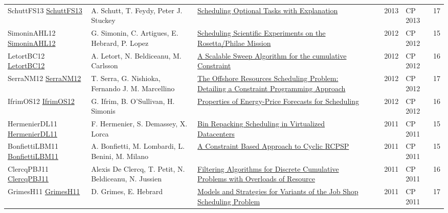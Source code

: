 {\begin{longtable}{p{3cm}p{6cm}p{7cm}rrrp{3cm}r}
SchuttFS13 \href{https://doi.org/10.1007/978-3-642-40627-0\_47}{SchuttFS13} & A. Schutt, T. Feydy, Peter J. Stuckey & \href{papers/SchuttFS13.pdf}{Scheduling Optional Tasks with Explanation} &  & \cite{SchuttFS13} & 2013 & CP 2013 & 17\\
SimoninAHL12 \href{https://doi.org/10.1007/978-3-642-33558-7\_5}{SimoninAHL12} & G. Simonin, C. Artigues, E. Hebrard, P. Lopez & \href{papers/SimoninAHL12.pdf}{Scheduling Scientific Experiments on the Rosetta/Philae Mission} &  & \cite{SimoninAHL12} & 2012 & CP 2012 & 15\\
LetortBC12 \href{https://doi.org/10.1007/978-3-642-33558-7\_33}{LetortBC12} & A. Letort, N. Beldiceanu, M. Carlsson & \href{papers/LetortBC12.pdf}{A Scalable Sweep Algorithm for the cumulative Constraint} &  & \cite{LetortBC12} & 2012 & CP 2012 & 16\\
SerraNM12 \href{https://doi.org/10.1007/978-3-642-33558-7\_59}{SerraNM12} & T. Serra, G. Nishioka, Fernando J. M. Marcellino & \href{papers/SerraNM12.pdf}{The Offshore Resources Scheduling Problem: Detailing a Constraint Programming Approach} &  & \cite{SerraNM12} & 2012 & CP 2012 & 17\\
IfrimOS12 \href{https://doi.org/10.1007/978-3-642-33558-7\_68}{IfrimOS12} & G. Ifrim, B. O'Sullivan, H. Simonis & \href{papers/IfrimOS12.pdf}{Properties of Energy-Price Forecasts for Scheduling} &  & \cite{IfrimOS12} & 2012 & CP 2012 & 16\\
HermenierDL11 \href{https://doi.org/10.1007/978-3-642-23786-7\_5}{HermenierDL11} & F. Hermenier, S. Demassey, X. Lorca & \href{papers/HermenierDL11.pdf}{Bin Repacking Scheduling in Virtualized Datacenters} &  & \cite{HermenierDL11} & 2011 & CP 2011 & 15\\
BonfiettiLBM11 \href{https://doi.org/10.1007/978-3-642-23786-7\_12}{BonfiettiLBM11} & A. Bonfietti, M. Lombardi, L. Benini, M. Milano & \href{papers/BonfiettiLBM11.pdf}{A Constraint Based Approach to Cyclic {RCPSP}} &  & \cite{BonfiettiLBM11} & 2011 & CP 2011 & 15\\
ClercqPBJ11 \href{https://doi.org/10.1007/978-3-642-23786-7\_20}{ClercqPBJ11} & Alexis De Clercq, T. Petit, N. Beldiceanu, N. Jussien & \href{papers/ClercqPBJ11.pdf}{Filtering Algorithms for Discrete Cumulative Problems with Overloads of Resource} &  & \cite{ClercqPBJ11} & 2011 & CP 2011 & 16\\
GrimesH11 \href{https://doi.org/10.1007/978-3-642-23786-7\_28}{GrimesH11} & D. Grimes, E. Hebrard & \href{papers/GrimesH11.pdf}{Models and Strategies for Variants of the Job Shop Scheduling Problem} &  & \cite{GrimesH11} & 2011 & CP 2011 & 17\\

\end{longtable}}
